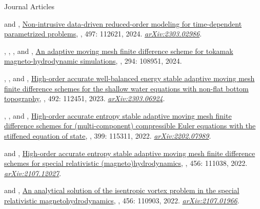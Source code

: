%
\begin{cvpublicationsection}{Journal Articles}
%
\item[\pubenum]  and , \href{https://doi.org/10.1016/j.jcp.2023.112621}{Non-intrusive data-driven reduced-order modeling for time-dependent parametrized problems}, , 497: 112621, 2024. \href{https://arxiv.org/abs/2303.02986}{\em arXiv:2303.02986}.
%
\item[\pubenum] , , , and , \href{https://doi.org/10.1016/j.cpc.2023.108951}{An adaptive moving mesh finite difference scheme for tokamak magneto-hydrodynamic simulations}, , 294: 108951, 2024.
%
\item[\pubenum] , , and , \href{https://doi.org/10.1016/j.jcp.2023.112451}{High-order accurate well-balanced energy stable adaptive moving mesh finite difference schemes for the shallow water equations with non-flat bottom topography}, , 492: 112451, 2023. \href{https://arxiv.org/abs/2303.06924}{\em arXiv:2303.06924}.
%
\item[\pubenum] , , and , \href{https://doi.org/10.1016/j.cma.2022.115311}{High-order accurate entropy stable adaptive moving mesh finite difference schemes for (multi-component) compressible Euler equations with the stiffened equation of state}, , 399: 115311, 2022. \href{https://arxiv.org/abs/2202.07989}{\em arXiv:2202.07989}.
%
\item[\pubenum]  and , \href{https://doi.org/10.1016/j.jcp.2022.111038}{High-order accurate entropy stable adaptive moving mesh finite difference schemes for special relativistic (magneto)hydrodynamics}, , 456: 111038, 2022. \href{https://arxiv.org/abs/2107.12027}{\em arXiv:2107.12027}.
%
\item[\pubenum]  and , \href{https://doi.org/10.1016/j.jcp.2021.110903}{An analytical solution of the isentropic vortex problem in the special relativistic magnetohydrodynamics}, , 456: 110903, 2022. \href{https://arxiv.org/abs/2107.01966}{\em arXiv:2107.01966}.

\end{cvpublicationsection}
